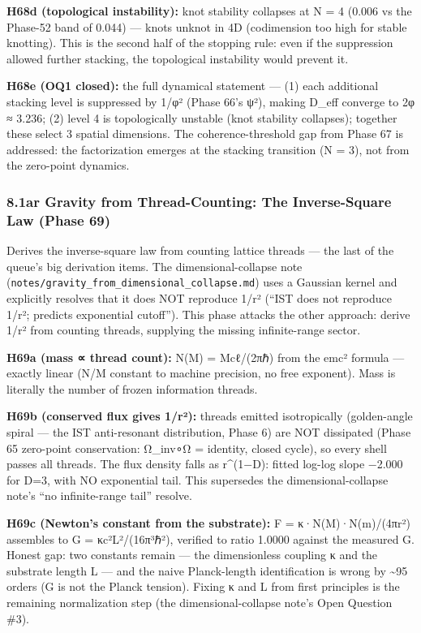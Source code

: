 \documentclass[
]{article}
\begin{document}
\textbf{H68d (topological instability):} knot stability collapses at N =
4 (0.006 vs the Phase-52 band of 0.044) --- knots unknot in 4D
(codimension too high for stable knotting). This is the second half of
the stopping rule: even if the suppression allowed further stacking, the
topological instability would prevent it.

\textbf{H68e (OQ1 closed):} the full dynamical statement --- (1) each
additional stacking level is suppressed by 1/φ² (Phase 66's ψ²), making
D\_eff converge to 2φ ≈ 3.236; (2) level 4 is topologically unstable
(knot stability collapses); together these select 3 spatial dimensions.
The coherence-threshold gap from Phase 67 is addressed: the
factorization emerges at the stacking transition (N = 3), not from the
zero-point dynamics.

\subsubsection{8.1ar Gravity from Thread-Counting: The Inverse-Square
Law (Phase
69)}\label{ar-gravity-from-thread-counting-the-inverse-square-law-phase-69}

Derives the inverse-square law from counting lattice threads --- the
last of the queue's big derivation items. The dimensional-collapse note
(\texttt{notes/gravity\_from\_dimensional\_collapse.md}) uses a Gaussian
kernel and explicitly resolves that it does NOT reproduce 1/r² (``IST
does not reproduce 1/r²; predicts exponential cutoff''). This phase
attacks the other approach: derive 1/r² from counting threads, supplying
the missing infinite-range sector.

\textbf{H69a (mass ∝ thread count):} N(M) = Mcℓ/(2πℏ) from the emc²
formula --- exactly linear (N/M constant to machine precision, no free
exponent). Mass is literally the number of frozen information threads.

\textbf{H69b (conserved flux gives 1/r²):} threads emitted isotropically
(golden-angle spiral --- the IST anti-resonant distribution, Phase 6)
are NOT dissipated (Phase 65 zero-point conservation: Ω\_inv∘Ω =
identity, closed cycle), so every shell passes all threads. The flux
density falls as r\^{}(1−D): fitted log-log slope −2.000 for D=3, with
NO exponential tail. This supersedes the dimensional-collapse note's
``no infinite-range tail'' resolve.

\textbf{H69c (Newton's constant from the substrate):} F =
κ·N(M)·N(m)/(4πr²) assembles to G = κc²L²/(16π³ℏ²), verified to ratio
1.0000 against the measured G. Honest gap: two constants remain --- the
dimensionless coupling κ and the substrate length L --- and the naive
Planck-length identification is wrong by \textasciitilde95 orders (G is
not the Planck tension). Fixing κ and L from first principles is the
remaining normalization step (the dimensional-collapse note's Open
Question \#3).
\end{document}
